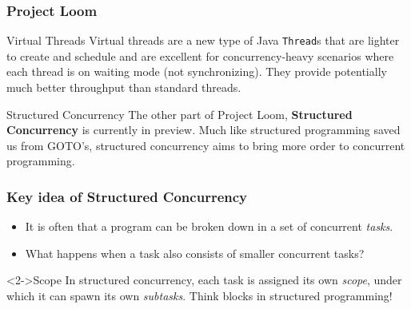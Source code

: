 \documentclass[xcolor={dvipsnames,svgnames},aspectratio=169]{beamer}
\begin{document}
\begin{frame}[fragile]
  \frametitle{Project Loom}

  \begin{block}{\faLightbulb \quad Virtual Threads}
    Virtual threads are a new type of Java \texttt{Thread}s that are lighter to
    create and schedule and are excellent for concurrency-heavy scenarios where
    each thread is on waiting mode (not synchronizing). They provide potentially
    much better throughput than standard threads.
  \end{block}
  \vspace{0.4cm}
  \pause
  \begin{block}{\faLightbulb \quad Structured Concurrency}
    The other part of Project Loom, \textbf{Structured Concurrency} is currently
    in preview. Much like structured programming saved us from GOTO's,
    structured concurrency aims to bring more order to concurrent programming.
  \end{block}

\end{frame}

\begin{frame}[fragile]
  \frametitle{Key idea of Structured Concurrency}

  \begin{itemize}
  \item[\faBook]<1-> It is often that a program can be broken down in
    a set of concurrent \emph{tasks}.
  \item[\faBook]<1-> What happens when a task also consists of smaller
    concurrent tasks?
  \end{itemize}
  \vspace{0.8cm}
  \begin{block}<2->{\faLightbulb \quad Scope}
    In structured concurrency, each task is assigned its own \emph{scope}, under
    which it can spawn its own \emph{subtasks}. Think blocks in structured
    programming!
  \end{block}
\end{frame}
\end{document}
